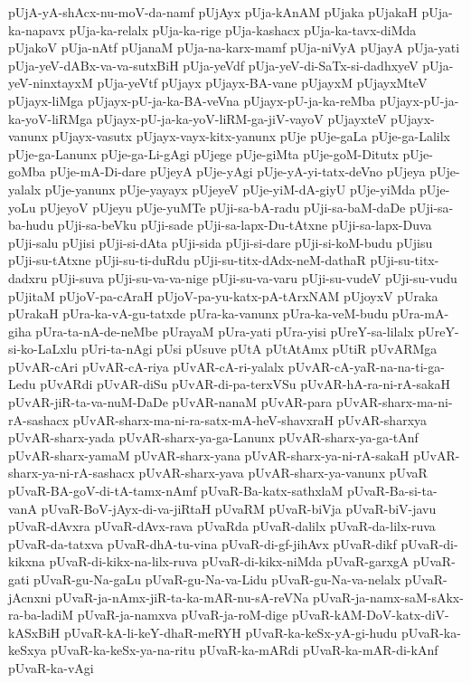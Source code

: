 {pUjA-yA-shAcx-nu-moV-da-namf
pUjAyx
pUja-kAnAM
pUjaka
pUjakaH
pUja-ka-napavx
pUja-ka-relalx
pUja-ka-rige
pUja-kashacx
pUja-ka-tavx-diMda
pUjakoV
pUja-nAtf
pUjanaM
pUja-na-karx-mamf
pUja-niVyA
pUjayA
pUja-yati
pUja-yeV-dABx-va-va-sutxBiH
pUja-yeVdf
pUja-yeV-di-SaTx-si-dadhxyeV
pUja-yeV-ninxtayxM
pUja-yeVtf
pUjayx
pUjayx-BA-vane
pUjayxM
pUjayxMteV
pUjayx-liMga
pUjayx-pU-ja-ka-BA-veVna
pUjayx-pU-ja-ka-reMba
pUjayx-pU-ja-ka-yoV-liRMga
pUjayx-pU-ja-ka-yoV-liRM-ga-jiV-vayoV
pUjayxteV
pUjayx-vanunx
pUjayx-vasutx
pUjayx-vayx-kitx-yanunx
pUje
pUje-gaLa
pUje-ga-Lalilx
pUje-ga-Lanunx
pUje-ga-Li-gAgi
pUjege
pUje-giMta
pUje-goM-Ditutx
pUje-goMba
pUje-mA-Di-dare
pUjeyA
pUje-yAgi
pUje-yA-yi-tatx-deVno
pUjeya
pUje-yalalx
pUje-yanunx
pUje-yayayx
pUjeyeV
pUje-yiM-dA-giyU
pUje-yiMda
pUje-yoLu
pUjeyoV
pUjeyu
pUje-yuMTe
pUji-sa-bA-radu
pUji-sa-baM-daDe
pUji-sa-ba-hudu
pUji-sa-beVku
pUji-sade
pUji-sa-lapx-Du-tAtxne
pUji-sa-lapx-Duva
pUji-salu
pUjisi
pUji-si-dAta
pUji-sida
pUji-si-dare
pUji-si-koM-budu
pUjisu
pUji-su-tAtxne
pUji-su-ti-duRdu
pUji-su-titx-dAdx-neM-dathaR
pUji-su-titx-dadxru
pUji-suva
pUji-su-va-va-nige
pUji-su-va-varu
pUji-su-vudeV
pUji-su-vudu
pUjitaM
pUjoV-pa-cAraH
pUjoV-pa-yu-katx-pA-tArxNAM
pUjoyxV
pUraka
pUrakaH
pUra-ka-vA-gu-tatxde
pUra-ka-vanunx
pUra-ka-veM-budu
pUra-mA-giha
pUra-ta-nA-de-neMbe
pUrayaM
pUra-yati
pUra-yisi
pUreY-sa-lilalx
pUreY-si-ko-LaLxlu
pUri-ta-nAgi
pUsi
pUsuve
pUtA
pUtAtAmx
pUtiR
pUvARMga
pUvAR-cAri
pUvAR-cA-riya
pUvAR-cA-ri-yalalx
pUvAR-cA-yaR-na-na-ti-ga-Ledu
pUvARdi
pUvAR-diSu
pUvAR-di-pa-terxVSu
pUvAR-hA-ra-ni-rA-sakaH
pUvAR-jiR-ta-va-nuM-DaDe
pUvAR-nanaM
pUvAR-para
pUvAR-sharx-ma-ni-rA-sashacx
pUvAR-sharx-ma-ni-ra-satx-mA-heV-shavxraH
pUvAR-sharxya
pUvAR-sharx-yada
pUvAR-sharx-ya-ga-Lanunx
pUvAR-sharx-ya-ga-tAnf
pUvAR-sharx-yamaM
pUvAR-sharx-yana
pUvAR-sharx-ya-ni-rA-sakaH
pUvAR-sharx-ya-ni-rA-sashacx
pUvAR-sharx-yava
pUvAR-sharx-ya-vanunx
pUvaR
pUvaR-BA-goV-di-tA-tamx-nAmf
pUvaR-Ba-katx-sathxlaM
pUvaR-Ba-si-ta-vanA
pUvaR-BoV-jAyx-di-va-jiRtaH
pUvaRM
pUvaR-biVja
pUvaR-biV-javu
pUvaR-dAvxra
pUvaR-dAvx-rava
pUvaRda
pUvaR-dalilx
pUvaR-da-lilx-ruva
pUvaR-da-tatxva
pUvaR-dhA-tu-vina
pUvaR-di-gf-jihAvx
pUvaR-dikf
pUvaR-di-kikxna
pUvaR-di-kikx-na-lilx-ruva
pUvaR-di-kikx-niMda
pUvaR-garxgA
pUvaR-gati
pUvaR-gu-Na-gaLu
pUvaR-gu-Na-va-Lidu
pUvaR-gu-Na-va-nelalx
pUvaR-jAcnxni
pUvaR-ja-nAmx-jiR-ta-ka-mAR-nu-sA-reVNa
pUvaR-ja-namx-saM-sAkx-ra-ba-ladiM
pUvaR-ja-namxva
pUvaR-ja-roM-dige
pUvaR-kAM-DoV-katx-diV-kASxBiH
pUvaR-kA-li-keY-dhaR-meRYH
pUvaR-ka-keSx-yA-gi-hudu
pUvaR-ka-keSxya
pUvaR-ka-keSx-ya-na-ritu
pUvaR-ka-mARdi
pUvaR-ka-mAR-di-kAnf
pUvaR-ka-vAgi
}
